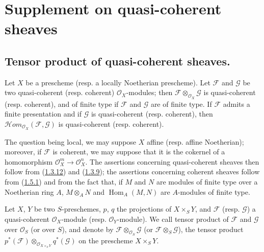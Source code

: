 \section{Supplement on quasi-coherent sheaves}
\label{section:I.9}

\subsection{Tensor product of quasi-coherent sheaves.}
\label{subsection:I.9.1}

\begin{proposition}[9.1.1]
\label{I.9.1.1}
Let $X$ be a prescheme \textup{(resp.} a locally Noetherian prescheme). Let
$\mathscr{F}$ and $\mathscr{G}$ be two quasi-coherent \textup{(resp.} coherent)
$\mathscr{O}_X$-modules; then
$\mathscr{F}\otimes_{\mathscr{O}_X}\mathscr{G}$ is quasi-coherent \textup{(resp.}
coherent), and of finite type if $\mathscr{F}$ and $\mathscr{G}$ are of
finite type. If $\mathscr{F}$ admits a finite presentation and if
$\mathscr{G}$ is quasi-coherent \textup{(resp.} coherent), then
$\mathscr{H}\!om_{\mathscr{O}_X}(\mathscr{F},\mathscr{G})$ is quasi-coherent
\textup{(resp.} coherent).
\end{proposition}

The question being local, we may suppose $X$ affine (resp. affine
Noetherian); moreover, if $\mathscr{F}$ is coherent, we may suppose that it
is the cokernel of a homomorphism
$\mathscr{O}_X^m\to\mathscr{O}_X^n$. The assertions concerning quasi-coherent
sheaves then follow from
(\hyperref[I.1.3.12]{1.3.12}) and
(\hyperref[I.1.3.9]{1.3.9}); the assertions concerning coherent
sheaves follow from (\hyperref[I.1.5.1]{1.5.1}) and from the fact that, if
$M$ and $N$ are modules of finite type over a Noetherian ring $A$,
$M\otimes_A N$ and $\operatorname{Hom}_A(M,N)$ are $A$-modules of finite
type.

\begin{definition}[9.1.2]
\label{I.9.1.2}
Let $X$, $Y$ be two $S$-preschemes, $p$, $q$ the projections of
$X\times_S Y$, and $\mathscr{F}$ \textup{(resp. $\mathscr{G}$)} a quasi-coherent
$\mathscr{O}_X$-module \textup{(resp.} $\mathscr{O}_Y$-module). We call tensor
product of $\mathscr{F}$ and $\mathscr{G}$ over $\mathscr{O}_S$ (or over
$S$), and denote by
$\mathscr{F}\otimes_{\mathscr{O}_S}\mathscr{G}$ (or
$\mathscr{F}\otimes_S\mathscr{G}$), the tensor product
$p^*(\mathscr{F})\otimes_{\mathscr{O}_{X\times_S Y}}q^*(\mathscr{G})$ on the
prescheme $X\times_S Y$.
\end{definition}

